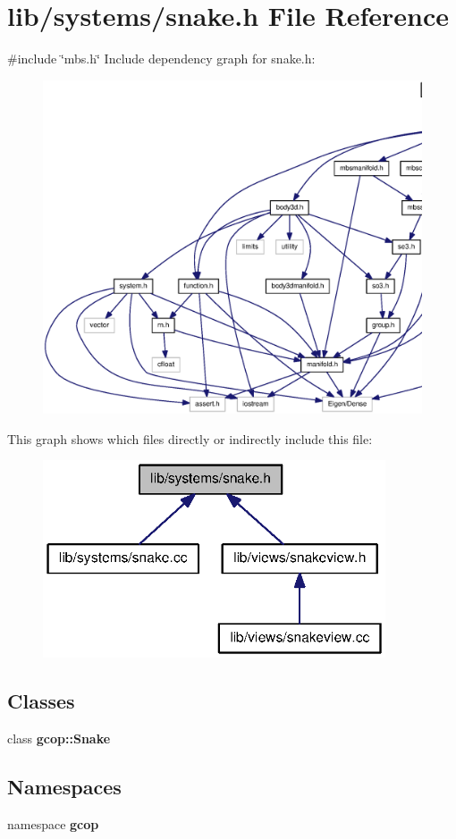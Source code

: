 \section{lib/systems/snake.h \-File \-Reference}
\label{snake_8h}
{\ttfamily \#include \char`\"{}mbs.\-h\char`\"{}}\*
\-Include dependency graph for snake.\-h\-:
\nopagebreak
\begin{figure}[H]
\begin{center}
\leavevmode
\includegraphics[width=350pt]{snake_8h__incl}
\end{center}
\end{figure}
\-This graph shows which files directly or indirectly include this file\-:
\nopagebreak
\begin{figure}[H]
\begin{center}
\leavevmode
\includegraphics[width=287pt]{snake_8h__dep__incl}
\end{center}
\end{figure}
\subsection*{\-Classes}
\begin{DoxyCompactItemize}
\item 
class {\bf gcop\-::\-Snake}
\end{DoxyCompactItemize}
\subsection*{\-Namespaces}
\begin{DoxyCompactItemize}
\item 
namespace {\bf gcop}
\end{DoxyCompactItemize}
